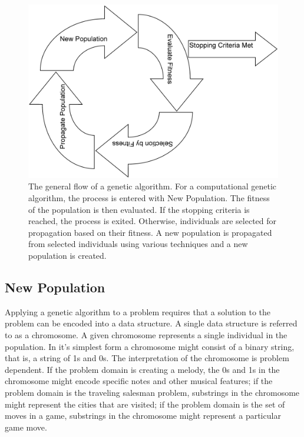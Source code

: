 \begin{figure}[htp]
\centerline{\includegraphics[width=1.0\columnwidth]{Figures/GAFlow.png}}
\caption[Genetic Algorithm Flow]{The general flow of a genetic algorithm. For a
computational genetic algorithm, the process is entered with New Population.
The fitness of the population is then evaluated. If the stopping criteria is
reached, the process is exited. Otherwise, individuals are selected for
propagation based on their fitness. A new population is propagated from
selected individuals using various techniques and a new population is created.}
\label{figure-gaflow}
\end{figure}

\subsection{New Population}

Applying a genetic algorithm to a problem requires that a solution to the
problem can be encoded into a data structure. A single data structure is
referred to as a chromosome. A given chromosome represents a single individual
in the population. In it's simplest form a chromosome might consist of a binary
string, that is, a string of 1s and 0s. The interpretation of the chromosome is
problem dependent. If the problem domain is creating a melody, the 0s and 1s in
the chromosome might encode specific notes and other musical features; if the
problem domain is the traveling salesman problem, substrings in the chromosome
might represent the cities that are visited; if the problem domain is the set of
moves in a game, substrings in the chromosome might represent a particular game
move.

